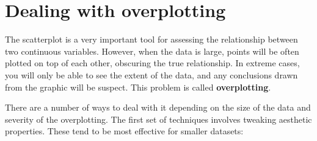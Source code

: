 \hypertarget{sec:overplotting}{\section{Dealing with
overplotting}\label{sec:overplotting}}

The scatterplot is a very important tool for assessing the relationship
between two continuous variables. However, when the data is large,
points will be often plotted on top of each other, obscuring the true
relationship. In extreme cases, you will only be able to see the extent
of the data, and any conclusions drawn from the graphic will be suspect.
This problem is called \textbf{overplotting}. 

There are a number of ways to deal with it depending on the size of the
data and severity of the overplotting. The first set of techniques
involves tweaking aesthetic properties. These tend to be most effective
for smaller datasets:

